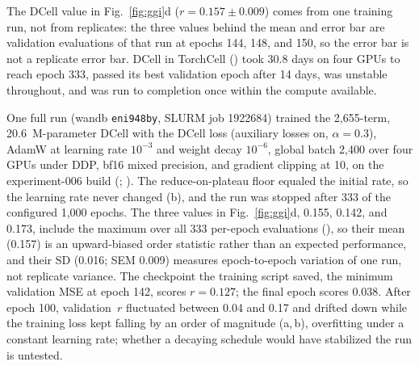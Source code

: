 \clearpage
{}

The DCell value in Fig.~\ref{fig:ggi}d ($r=0.157\pm0.009$) comes from one training run,
not from replicates: the three values behind the mean and error bar are validation
evaluations of that run at epochs 144, 148, and 150, so the error bar is not a replicate
error bar. DCell in TorchCell () took 30.8 days on four GPUs
to reach epoch 333, passed its best validation epoch after 14 days, was unstable
throughout, and was run to completion once within the compute available.

 One full run (wandb \texttt{eni948by},
SLURM job 1922684) trained the 2,655-term, 20.6~M-parameter DCell with the DCell loss
(auxiliary losses on, $\alpha=0.3$), AdamW at learning rate $10^{-3}$ and weight decay
$10^{-6}$, global batch 2,400 over four GPUs under DDP, bf16 mixed precision, and gradient
clipping at 10, on the experiment-006 build (;
). The reduce-on-plateau floor equaled the initial rate,
so the learning rate never changed (b), and the run was stopped
after 333 of the configured 1,000 epochs. The three values in Fig.~\ref{fig:ggi}d, 0.155,
0.142, and 0.173, include the maximum over all 333 per-epoch evaluations
(), so their mean (0.157) is an upward-biased order
statistic rather than an expected performance, and their SD (0.016; SEM 0.009) measures
epoch-to-epoch variation of one run, not replicate variance. The checkpoint the training
script saved, the minimum validation MSE at epoch 142, scores $r=0.127$; the final epoch
scores 0.038. After epoch 100, validation~$r$ fluctuated between 0.04 and 0.17 and drifted
down while the training loss kept falling by an order of magnitude
(a,\,b), overfitting under a constant learning rate; whether a
decaying schedule would have stabilized the run is untested.


